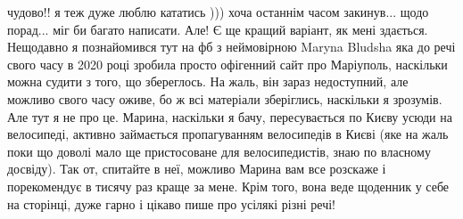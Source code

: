 чудово!! я теж дуже люблю кататись ))) хоча останнім часом закинув... щодо
порад... міг би багато написати. Але! Є ще кращий варіант, як мені здається.
Нещодавно я познайомився тут на фб з неймовірною Maryna Bludsha яка до речі
свого часу в 2020 році зробила просто офігенний сайт про Маріуполь, наскільки
можна судити з того, що збереглось. На жаль, він зараз недоступний, але можливо
свого часу оживе, бо ж всі матеріали зберіглись, наскільки я зрозумів. Але тут
я не про це. Марина, наскільки я бачу, пересувається по Києву усюди на
велосипеді, активно займається пропагуванням велосипедів в Києві (яке на жаль
поки що доволі мало ще пристосоване для велосипедистів, знаю по власному
досвіду). Так от, спитайте в неї, можливо Марина вам все розскаже і
порекомендує в тисячу раз краще за мене. Крім того, вона веде щоденник у себе
на сторінці, дуже гарно і цікаво пише про усілякі різні речі!
